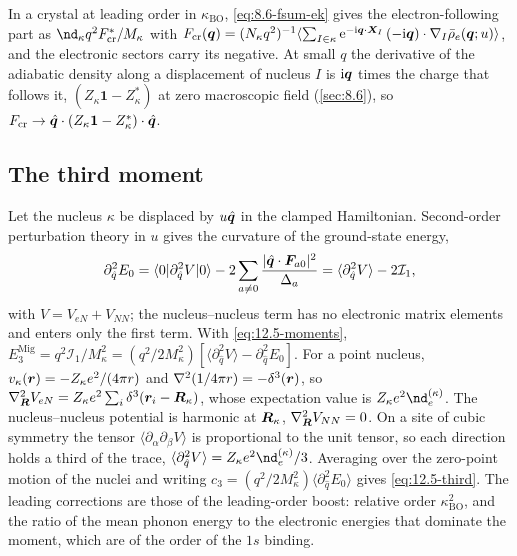 In a crystal at leading order in $\kappa_{\mathrm{BO}}$, \cref{eq:8.6-fsum-ek} gives the electron-following part as $\nd_\kappa q^2F_{\mathrm{cr}}^*/M_\kappa$ with $F_{\mathrm{cr}}(\bm{q}) = (N_\kappa q^2)^{-1}\langle\sum_{I\in\kappa}\mathrm{e}^{-\mathrm{i}\bm{q}\cdot\bm{X}_I}\,(-\mathrm{i}\bm{q})\cdot\nabla_I\bar\rho_e(\bm{q};u)\rangle$, and the electronic sectors carry its negative. At small $q$ the derivative of the adiabatic density along a displacement of nucleus $I$ is $\mathrm{i}\bm{q}$ times the charge that follows it, $(Z_\kappa\mathbf{1} - Z^*_\kappa)$ at zero macroscopic field (\cref{sec:8.6}), so $F_{\mathrm{cr}} \to \hat{\bm{q}}\cdot(Z_\kappa\mathbf{1} - Z^*_\kappa)\cdot\hat{\bm{q}}$.

\subsection{The third moment}\label{app:D.34-third}

Let the nucleus $\kappa$ be displaced by $u\hat{\bm{q}}$ in the clamped Hamiltonian. Second-order perturbation theory in $u$ gives the curvature of the ground-state energy,
\begin{equation*}
  \partial^2_{\hat q}E_0 = \langle0|\partial^2_{\hat q}V|0\rangle - 2\sum_{a\neq0}\frac{|\hat{\bm{q}}\cdot\bm{F}_{a0}|^2}{\Delta_a} = \langle\partial^2_{\hat q}V\rangle - 2\mathcal{I}_1 ,
\end{equation*}
with $V = V_{eN} + V_{NN}$; the nucleus--nucleus term has no electronic matrix elements and enters only the first term. With \cref{eq:12.5-moments}, $E^{\mathrm{Mig}}_3 = q^2\mathcal{I}_1/M_\kappa^2 = (q^2/2M_\kappa^2)[\langle\partial^2_{\hat q}V\rangle - \partial^2_{\hat q}E_0]$. For a point nucleus, $v_\kappa(\bm{r}) = -Z_\kappa e^2/(4\pi r)$ and $\nabla^2(1/4\pi r) = -\delta^3(\bm{r})$, so $\nabla^2_{\bm{R}}V_{eN} = Z_\kappa e^2\sum_i\delta^3(\bm{r}_i - \bm{R}_\kappa)$, whose expectation value is $Z_\kappa e^2\nd_e^{(\kappa)}$. The nucleus--nucleus potential is harmonic at $\bm{R}_\kappa$, $\nabla^2_{\bm{R}}V_{NN} = 0$. On a site of cubic symmetry the tensor $\langle\partial_\alpha\partial_\beta V\rangle$ is proportional to the unit tensor, so each direction holds a third of the trace, $\langle\partial^2_{\hat q}V\rangle = Z_\kappa e^2\nd_e^{(\kappa)}/3$. Averaging over the zero-point motion of the nuclei and writing $c_3 = (q^2/2M_\kappa^2)\langle\partial^2_{\hat q}E_0\rangle$ gives \cref{eq:12.5-third}. The leading corrections are those of the leading-order boost: relative order $\kappa_{\mathrm{BO}}^2$, and the ratio of the mean phonon energy to the electronic energies that dominate the moment, which are of the order of the $1s$ binding.

